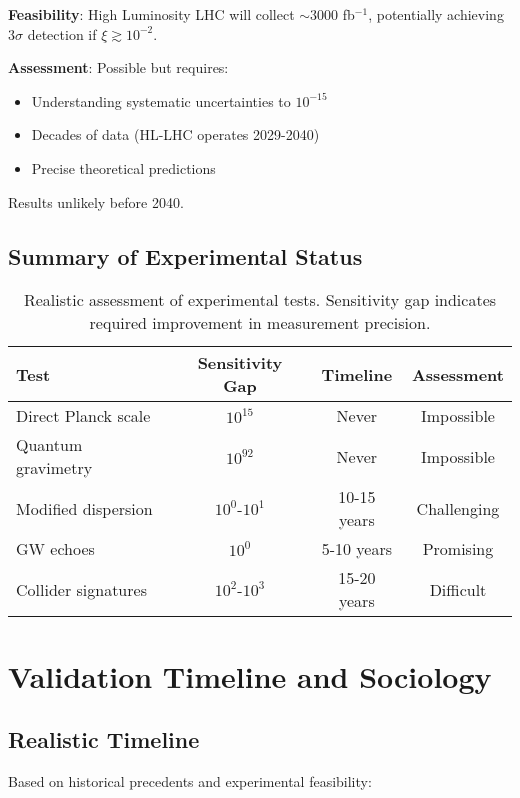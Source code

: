 \documentclass[12pt,twocolumn]{article}
\theoremstyle{definition}
\theoremstyle{remark}
\begin{document}
\textbf{Feasibility}: High Luminosity LHC will collect $\sim 3000$ fb$^{-1}$, potentially achieving $3\sigma$ detection if $\xi \gtrsim 10^{-2}$.

\textbf{Assessment}: Possible but requires:
\begin{itemize}
\item Understanding systematic uncertainties to $10^{-15}$
\item Decades of data (HL-LHC operates 2029-2040)
\item Precise theoretical predictions
\end{itemize}

Results unlikely before 2040.

\subsection{Summary of Experimental Status}

\begin{table*}[t]
\centering
\begin{tabular}{|l|c|c|c|}
\hline
\textbf{Test} & \textbf{Sensitivity Gap} & \textbf{Timeline} & \textbf{Assessment} \\
\hline
Direct Planck scale & $10^{15}$ & Never & Impossible \\
Quantum gravimetry & $10^{92}$ & Never & Impossible \\
Modified dispersion & $10^{0}$-$10^{1}$ & 10-15 years & Challenging \\
GW echoes & $10^{0}$ & 5-10 years & Promising \\
Collider signatures & $10^{2}$-$10^{3}$ & 15-20 years & Difficult \\
\hline
\end{tabular}
\caption{Realistic assessment of experimental tests. Sensitivity gap indicates required improvement in measurement precision.}
\end{table*}

\section{Validation Timeline and Sociology}

\subsection{Realistic Timeline}

Based on historical precedents and experimental feasibility:
\end{document}
